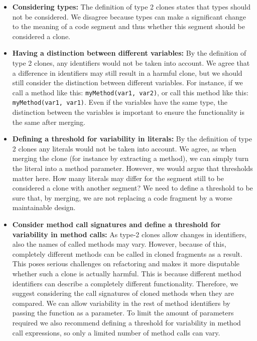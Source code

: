 \documentclass[a4paper]{article}
\begin{document}
\begin{itemize}
  \item \textbf{Considering types:} The definition of type 2 clones states that types should not be considered. We disagree because types can make a significant change to the meaning of a code segment and thus whether this segment should be considered a clone.
  \item \textbf{Having a distinction between different variables:} By the definition of type 2 clones, any identifiers would not be taken into account. We agree that a difference in identifiers may still result in a harmful clone, but we should still consider the distinction between different variables. For instance, if we call a method like this: \texttt{myMethod(var1, var2)}, or call this method like this: \texttt{myMethod(var1, var1)}. Even if the variables have the same type, the distinction between the variables is important to ensure the functionality is the same after merging.
  \item \textbf{Defining a threshold for variability in literals:} By the definition of type 2 clones any literals would not be taken into account. We agree, as when merging the clone (for instance by extracting a method), we can simply turn the literal into a method parameter. However, we would argue that thresholds matter here. How many literals may differ for the segment still to be considered a clone with another segment? We need to define a threshold to be sure that, by merging, we are not replacing a code fragment by a worse maintainable design.
  \item \textbf{Consider method call signatures and define a threshold for variability in method calls:} As type-2 clones allow changes in identifiers, also the names of called methods may vary. However, because of this, completely different methods can be called in cloned fragments as a result. This poses serious challenges on refactoring and makes it more disputable whether such a clone is actually harmful. This is because different method identifiers can describe a completely different functionality. Therefore, we suggest considering the call signatures of cloned methods when they are compared. We can allow variability in the rest of method identifiers by passing the function as a parameter. To limit the amount of parameters required we also recommend defining a threshold for variability in method call expressions, so only a limited number of method calls can vary.
\end{itemize}
\end{document}
